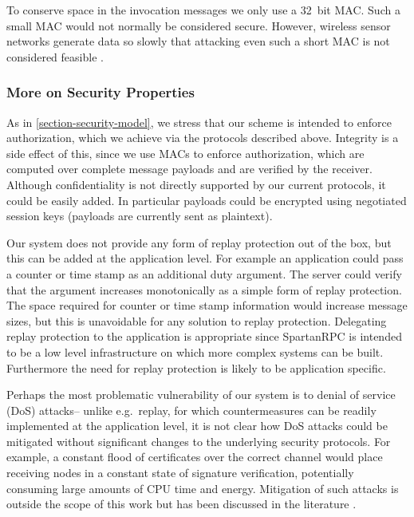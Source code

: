 
To conserve space in the invocation messages we only use a 32~bit MAC.
Such a small MAC would not normally be considered secure. However,
wireless sensor networks generate data so slowly that attacking even
such a short MAC is not considered feasible
\cite{karlog-tinysec-2004,luk-minisec-2007}.

\subsubsection{More on Security Properties}
\label{section-security-properties}

As in \autoref{section-security-model}, we stress that our scheme is
intended to enforce authorization, which we achieve via the protocols
described above. Integrity is a side effect of this, since we use MACs
to enforce authorization, which are computed over complete message
payloads and are verified by the receiver. Although confidentiality is
not directly supported by our current protocols, it could be easily
added. In particular payloads could be encrypted using negotiated
session keys (payloads are currently sent as plaintext).

Our system does not provide any form of replay protection out of the
box, but this can be added at the application level. For example an
application could pass a counter or time stamp as an additional duty
argument. The server could verify that the argument increases
monotonically as a simple form of replay protection. The space required
for counter or time stamp information would increase message sizes, but
this is unavoidable for any solution to replay protection. Delegating
replay protection to the application is appropriate since SpartanRPC is
intended to be a low level infrastructure on which more complex systems
can be built. Furthermore the need for replay protection is likely to be
application specific.

Perhaps the most problematic vulnerability of our system is to denial of
service (DoS) attacks-- unlike e.g.~replay, for which countermeasures
can be readily implemented at the application level, it is not clear how
DoS attacks could be mitigated without significant changes to the
underlying security protocols. For example, a constant flood of
certificates over the correct channel would place receiving nodes in a
constant state of signature verification, potentially consuming large
amounts of CPU time and energy. Mitigation of such attacks is outside
the scope of this work but has been discussed in the literature
\cite{4431860}.

